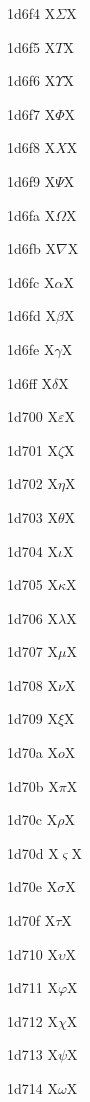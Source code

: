 \documentclass[11pt]{article}
\begin{document}
1d6f4 X{\ensuremath{\mathit{\Sigma}}}X

1d6f5 X{\ensuremath{\mathit{T}}}X

1d6f6 X{\ensuremath{\mathit{\Upsilon}}}X

1d6f7 X{\ensuremath{\mathit{\Phi}}}X

1d6f8 X{\ensuremath{\mathit{X}}}X

1d6f9 X{\ensuremath{\mathit{\Psi}}}X

1d6fa X{\ensuremath{\mathit{\Omega}}}X

1d6fb X{\ensuremath{\mathit{\nabla}}}X

1d6fc X{\ensuremath{\mathit{\alpha}}}X

1d6fd X{\ensuremath{\mathit{\beta}}}X

1d6fe X{\ensuremath{\mathit{\gamma}}}X

1d6ff X{\ensuremath{\mathit{\delta}}}X

1d700 X{\ensuremath{\mathit{\varepsilon}}}X

1d701 X{\ensuremath{\mathit{\zeta}}}X

1d702 X{\ensuremath{\mathit{\eta}}}X

1d703 X{\ensuremath{\mathit{\theta}}}X

1d704 X{\ensuremath{\mathit{\iota}}}X

1d705 X{\ensuremath{\mathit{\kappa}}}X

1d706 X{\ensuremath{\mathit{\lambda}}}X

1d707 X{\ensuremath{\mathit{\mu}}}X

1d708 X{\ensuremath{\mathit{\nu}}}X

1d709 X{\ensuremath{\mathit{\xi}}}X

1d70a X{\ensuremath{\mathit{o}}}X

1d70b X{\ensuremath{\mathit{\pi}}}X

1d70c X{\ensuremath{\mathit{\rho}}}X

1d70d X{\ensuremath{\mathit{\varsigma}}}X

1d70e X{\ensuremath{\mathit{\sigma}}}X

1d70f X{\ensuremath{\mathit{\tau}}}X

1d710 X{\ensuremath{\mathit{\upsilon}}}X

1d711 X{\ensuremath{\mathit{\varphi}}}X

1d712 X{\ensuremath{\mathit{\chi}}}X

1d713 X{\ensuremath{\mathit{\psi}}}X

1d714 X{\ensuremath{\mathit{\omega}}}X
\end{document}

